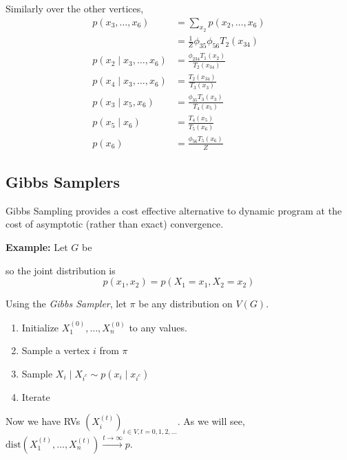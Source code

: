 \documentclass[12pt]{report}
\newcommand*{\tbf}[1]{\ifmmode\mathbf{#1}\else\textbf{#1}\fi}
\begin{document}
Similarly over the other vertices,
\begin{align*}
	p(x_3, \dots, x_6)             & = \sum_{x_2} p(x_2, \dots, x_6)               \\
	                               & = \frac{1}{Z} \phi_{35} \phi_{56} T_2(x_{34}) \\
	p(x_2 \; | \; x_3, \dots, x_6) & = \frac{\phi_{234} T_1(x_2)}{T_2(x_{34})}     \\
	p(x_4 \; | \; x_3, \dots, x_6) & = \frac{T_2(x_{34})}{T_3(x_3)}                \\
	p(x_3 \; | \; x_5, x_6)        & = \frac{\phi_{35} T_3(x_3)}{T_4(x_5)}         \\
	p(x_5\; | \; x_6)              & = \frac{T_4(x_5)}{T_5(x_6)}                   \\
	p(x_6)                         & = \frac{\phi_{56} T_5(x_6)}{Z}
\end{align*}

\subsection{Gibbs Samplers}
Gibbs Sampling provides a cost effective alternative to dynamic program at the cost of asymptotic (rather than exact) convergence.

\tbf{Example:} Let $G$ be

\begin{center}
\end{center}
so the joint distribution is
\[p(x_1, x_2) = p(X_1 = x_1, X_2 = x_2)\]

Using the\emph{ Gibbs Sampler}, let $\pi$ be any distribution on $V(G)$.
\begin{enumerate}
	\item Initialize $X_1^{(0)}, \dots, X_n^{(0)}$ to any values.
	\item Sample a vertex $i$ from $\pi$
	\item Sample $X_i \; | \; X_{i^c} \sim p(x_i \; | \; x_{i^c})$
	\item Iterate
\end{enumerate}

Now we have RVs $(X_i^{(t)})_{i \in V, t = 0, 1, 2, \dots}$. As we will see, $\text{dist}(X_1^{(t)}, \dots, X_n^{(t)}) \overset{t \to \infty}{\longrightarrow} p$.
\end{document}
